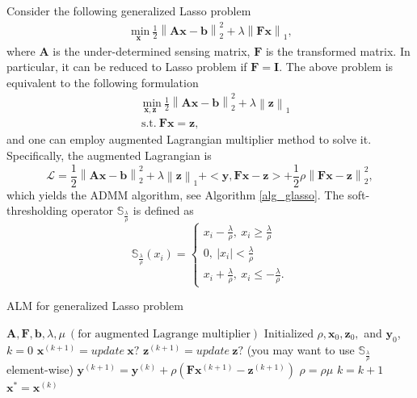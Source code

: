 \documentclass[10pt]{article}
\renewcommand{\mathbf}{\boldsymbol}
\newcommand{\mb}{\mathbf}
\newcommand{\Se}{\mathbb{S}}
\newcommand{\norm}[2]{\left\| #1 \right\|_{#2}}
\begin{document}
Consider the following generalized Lasso problem
\begin{equation} \label{glasso}
\begin{aligned}
\underset{\mb{x}} {\text{ min}} \  \frac{1}{2} \norm{\mb{A}\mb{x}-\mb{b}}{2}^2 + \lambda \norm{\mb{F}\mb{x}}{1}, 
\end{aligned}
\end{equation}
where $\mb{A}$ is the under-determined sensing matrix, $\mb{F}$ is the transformed matrix. In particular, it can be reduced to Lasso problem if $\mb{F} = \mb{I}$. The above problem is equivalent to the following formulation
\begin{equation} \label{glasso_adm}
\begin{aligned}
&\underset{\mb{x}, \mb{z}} {\text{ min}} \  \frac{1}{2} \norm{\mb{A}\mb{x}-\mb{b}}{2}^2 + \lambda \norm{\mb{z}}{1} \\
& \ \text{s.t.} \ \mb{F}\mb{x} = \mb{z},
\end{aligned}
\end{equation}
and one can employ augmented Lagrangian multiplier method to solve it. Specifically, the augmented Lagrangian is 
\begin{equation*}
\mathcal{L} = \frac{1}{2} \norm{\mb{A}\mb{x}-\mb{b}}{2}^2 + \lambda \norm{\mb{z}}{1} + <\mb{y}, \mb{F}\mb{x}- \mb{z}> + \frac{1}{2} \rho \norm{\mb{F}\mb{x} - \mb{z}}{2}^2,
\end{equation*}
which yields the ADMM algorithm, see Algorithm \ref{alg_glasso}. The soft-thresholding operator $\Se_{\frac{\lambda}{\rho}}$ is defined as 
\begin{equation}
\Se_{\frac{\lambda}{\rho}} (x_i) = \begin{cases}
x_i - \frac{\lambda}{\rho}, \ x_i \geq \frac{\lambda}{\rho} \\
0, \ |x_i| < \frac{\lambda}{\rho} \\
x_i + \frac{\lambda}{\rho}, \ x_i \leq -\frac{\lambda}{\rho}.
\end{cases}
\end{equation} 
\begin{algorithm}[h]
	\caption{ALM for generalized Lasso problem}
	\label{alg_glasso}
	\begin{algorithmic}[1] 
		\REQUIRE $\mb{A}, \mb{F}, \mb{b}, \lambda, \mu \ (\text{for augmented Lagrange multiplier})$
		\STATE Initialized $\rho, \mb{x}_0, \mb{z}_0,$ and $\mb{y}_0$, $k = 0$
		\STATE $\mb{x}^{(k+1)} = update \ \mb{x} ?$
		\STATE $\mb{z}^{(k+1)} = update \ \mb{z} ?$ (you may want to use $\Se_{\frac{\lambda}{\rho}}$ element-wise)
		\STATE $\mb{y}^{(k+1)} = \mb{y}^{(k)} + \rho (\mb{F} \mb{x}^{(k+1)} - \mb{z}^{(k+1)})$
		\STATE $\rho = \rho \mu$
		\STATE $k = k + 1$
		\ENDWHILE
		\ENSURE $\mb{x}^{*} = \mb{x}^{(k)}$
	\end{algorithmic}
\end{algorithm}
\end{document}
